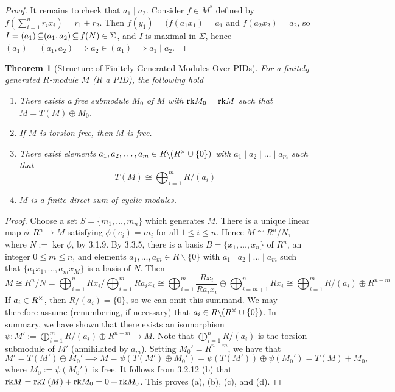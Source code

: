 \documentclass[11pt]{book}
\newcounter{counter}
\newtheorem{theorem}[counter]{Theorem}   \newtheorem*{theorem*}{Theorem}   \newtheorem{lemma}[counter]{Lemma}   \newtheorem{corollary}[counter]{Corollary}
\theoremstyle{definition}   \newtheorem{defn}[counter]{Definition} %
\newcommand{\bs}{\backslash}   \newcommand{\A}{\mathcal{A}}   \newcommand{\sy}{\textnormal{Syl}}   \newcommand{\size}[1]{\left| #1 \right|}
\DeclareMathOperator{\ra}{\rightarrow}   \DeclareMathOperator{\Poly}{\mathbf{P}}   \DeclareMathOperator{\spn}{\textnormal{span}}   \DeclareMathOperator{\aut}{\textnormal{Aut}}
\numberwithin{counter}{chapter}
\begin{document}
\begin{proof}
It remains to check that $a_1 \mid a_2$. Consider $f \in M^*$ defined by $f(\sum_{i=1}^n r_i x_i) = r_1 + r_2$. Then $f(y_1) = (f(a_1x_1) = a_1$ and $f(a_2 x_2) = a_2$, so $I = (a_1) \operatorname{\subseteq} (a_1,a_2) \operatorname{\subseteq} f(N) \in \Sigma$, and $I$ is maximal in $\Sigma$, hence $(a_1) = (a_1,a_2) \implies a_2 \in (a_1) \implies a_1 \mid a_2$.
\end{proof}

\newpage

\begin{theorem}[Structure of Finitely Generated Modules Over PIDs]
For a finitely generated $R$-module $M$ ($R$ a PID), the following hold
\begin{enumerate}
\item[(a)] There exists a free submodule $M_0$ of $M$ with $\textnormal{rk} M_0 = \textnormal{rk} M$ such that $M = T(M) \oplus M_0$.
\item[(b)] If $M$ is torsion free, then $M$ is free.
\item[(c)] There exist elements $a_1,a_2,\dots,a_m \in R\bs(R\x \cup \{0\})$ with $a_1 \mid a_2 \mid \dots \mid a_m$ such that
	\[T(M) \cong \bigoplus_{i=1}^m R/(a_i) \]
\item[(d)] $M$ is a finite direct sum of cyclic modules.
\end{enumerate}
\end{theorem}

\begin{proof}
Choose a set $S = \{m_1,\dots,m_n\}$ which generates $M$. There is a unique linear map $\phi : R^n \ra M$ satisfying $\phi(e_i) = m_i$ for all $1 \leq i \leq n$. Hence $M \cong R^n/N$, where $N := \ker \phi$, by 3.1.9. By 3.3.5, there is a basis $B = \{x_1,\dots,x_n\}$ of $R^n$, an integer $0 \leq m \leq n$, and elements $a_1,\dots,a_m \in R \bs \{0\}$ with $a_1 \mid a_2 \mid \dots \mid a_m$ such that $\{a_1x_1,\dots,a_mx_M\}$ is a basis of $N$. Then
	\[M \cong R^n/N = \bigoplus_{i=1}^n Rx_i/\bigoplus_{i=1}^m Ra_ix_i \cong \bigoplus_{i=1}^m \frac{Rx_i}{Ra_ix_i} \oplus \bigoplus_{i=m+1}^n Rx_i \cong \bigoplus_{i=1}^m R/(a_i) \oplus R^{n-m} \]
If $a_i \in R^{\times}$, then $R/(a_i) = \{0\}$, so we can omit this summand. We may therefore assume (renumbering, if necessary) that $a_i \in R \bs (R\x \cup \{0\})$. In summary, we have shown that there exists an isomorphism $\psi : M' := \bigoplus_{i=1}^m R/(a_i) \oplus R^{n-m} \ra M$. Note that $\bigoplus_{i=1}^n R/(a_i)$ is the torsion submodule of $M'$ (annihilated by $a_m$). Setting $M_0' = R^{n-m}$, we have that
	\[M' = T(M') \oplus M_0' \implies M = \psi(T(M') \oplus M_0') = \psi(T(M')) \oplus \psi(M_0') = T(M) + M_0, \]
where $M_0 := \psi(M_0')$ is free. It follows from 3.2.12 (b) that $\textnormal{rk} M = \textnormal{rk} T(M) + \textnormal{rk} M_0 = 0 + \textnormal{rk} M_0$. This proves (a), (b), (c), and (d).
\end{proof}
\end{document}
